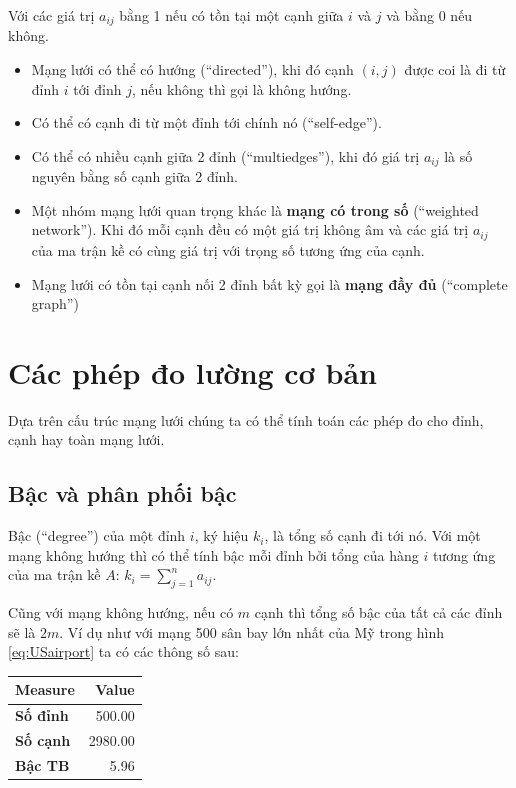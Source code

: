 \documentclass[]{book}
\begin{document}
Với các giá trị \(a_{ij}\) bằng 1 nếu có tồn tại một cạnh giữa \(i\) và
\(j\) và bằng 0 nếu không.

\begin{itemize}
\item
  Mạng lưới có thể có hướng (``directed''), khi đó cạnh \((i,j)\) được
  coi là đi từ đỉnh \(i\) tới đỉnh \(j\), nếu không thì gọi là không
  hướng.
\item
  Có thể có cạnh đi từ một đỉnh tới chính nó (``self-edge'').
\item
  Có thể có nhiều cạnh giữa 2 đỉnh (``multiedges''), khi đó giá trị
  \(a_{ij}\) là số nguyên bằng số cạnh giữa 2 đỉnh.
\item
  Một nhóm mạng lưới quan trọng khác là \textbf{mạng có trong số}
  (``weighted network''). Khi đó mỗi cạnh đều có một giá trị không âm và
  các giá trị \(a_{ij}\) của ma trận kề có cùng giá trị với trọng số
  tương ứng của cạnh.
\item
  Mạng lưới có tồn tại cạnh nối 2 đỉnh bất kỳ gọi là \textbf{mạng đầy
  đủ} (``complete graph'')
\end{itemize}

\section{Các phép đo lường cơ bản}\label{cac-phep-o-lung-co-ban}

Dựa trên cấu trúc mạng lưới chúng ta có thể tính toán các phép đo cho
đỉnh, cạnh hay toàn mạng lưới.

\subsection{Bậc và phân phối bậc}\label{bc-va-phan-phi-bc}

Bậc (``degree'') của một đỉnh \(i\), ký hiệu \(k_i\), là tổng số cạnh đi
tới nó. Với một mạng không hướng thì có thể tính bậc mỗi đỉnh bởi tổng
của hàng \(i\) tương ứng của ma trận kề \(A\):
\(k_i = \sum_{j = 1}^{n}a_{ij}\).

Cũng với mạng không hướng, nếu có \(m\) cạnh thì tổng số bậc của tất cả
các đỉnh sẽ là \(2m\). Ví dụ như với mạng 500 sân bay lớn nhất của Mỹ
trong hình \eqref{eq:USairport} ta có các thông số sau:

\begin{table}[H]
\centering
\begin{tabular}{>{\bfseries}l||r}
\hline
Measure & Value\\
\hline
Số đỉnh & 500.00\\
\hline
Số cạnh & 2980.00\\
\hline
Bậc TB & 5.96\\
\hline
\end{tabular}
\end{table}
\end{document}

